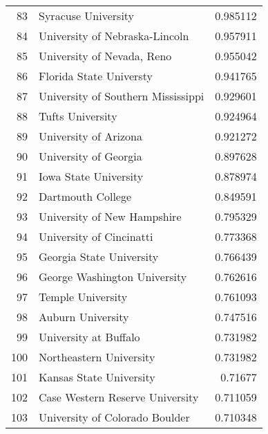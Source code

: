 \begin{tabular}{rlr}
  83 & Syracuse University                                            &  0.985112 \\
  84 & University of Nebraska-Lincoln                                 &  0.957911 \\
  85 & University of Nevada, Reno                                     &  0.955042 \\
  86 & Florida State Universty                                        &  0.941765 \\
  87 & University of Southern Mississippi                             &  0.929601 \\
  88 & Tufts University                                               &  0.924964 \\
  89 & University of Arizona                                          &  0.921272 \\
  90 & University of Georgia                                          &  0.897628 \\
  91 & Iowa State University                                          &  0.878974 \\
  92 & Dartmouth College                                              &  0.849591 \\
  93 & University of New Hampshire                                    &  0.795329 \\
  94 & University of Cincinatti                                       &  0.773368 \\
  95 & Georgia State University                                       &  0.766439 \\
  96 & George Washington University                                   &  0.762616 \\
  97 & Temple University                                              &  0.761093 \\
  98 & Auburn University                                              &  0.747516 \\
  99 & University at Buffalo                                          &  0.731982 \\
 100 & Northeastern University                                        &  0.731982 \\
 101 & Kansas State University                                        &  0.71677  \\
 102 & Case Western Reserve University                                &  0.711059 \\
 103 & University of Colorado Boulder                                 &  0.710348 \\

\end{tabular}
